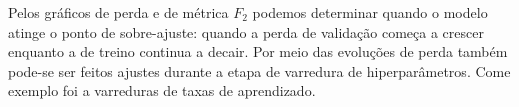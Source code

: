 Pelos gráficos de perda e de métrica $F_2$ podemos determinar quando o modelo atinge o ponto de sobre-ajuste: quando a perda de validação começa a crescer enquanto a de treino continua a decair. Por meio das evoluções de perda também pode-se ser feitos ajustes durante a etapa de varredura de hiperparâmetros. Come exemplo foi a varreduras de taxas de aprendizado.